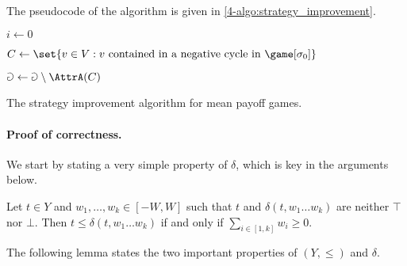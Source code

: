 The pseudocode of the algorithm is given in \cref{4-algo:strategy_improvement}.

\begin{algorithm}
 \DontPrintSemicolon
 
 $i \leftarrow 0$
 

 $C \leftarrow \set{v \in V : v \text{ contained in a negative cycle in } \game[\sigma_0]}$

 $\Game \leftarrow \Game \setminus \AttrA(C)$
 

 \caption{The strategy improvement algorithm for mean payoff games.}
\label{4-algo:strategy_improvement}
\end{algorithm}


\paragraph{\bf Proof of correctness.}
We start by stating a very simple property of $\delta$, which is key in the arguments below.

\begin{fact}
Let $t \in Y$ and $w_1,\dots,w_k \in [-W,W]$ such that $t$ and $\delta(t,w_1 \dots w_k)$ are neither $\top$ nor $\bot$.
Then $t \le \delta(t,w_1 \dots w_k)$ if and only if $\sum_{i \in [1,k]} w_i \ge 0$.
\end{fact}

The following lemma states the two important properties of $(Y,\le)$ and $\delta$.


